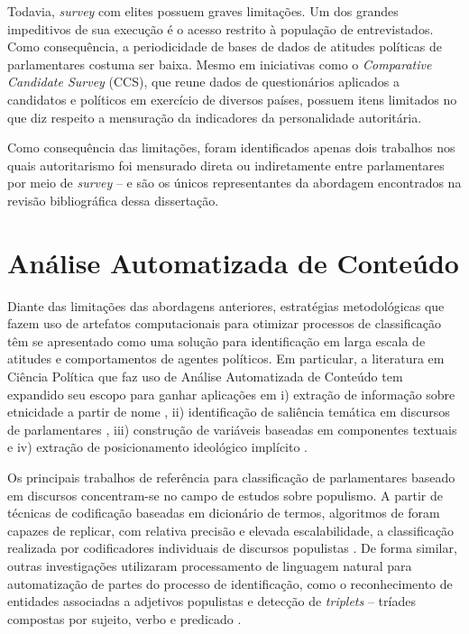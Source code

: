 \documentclass[
12pt,				%
openright,			%
twoside,			%
a4paper,			%
english,			%
french,				%
spanish,			%
brazil				%
]{abntex2}
\begin{document}
Todavia, \emph{survey} com elites possuem graves limitações. Um dos grandes impeditivos de sua execução é o acesso restrito à população de entrevistados. Como consequência, a periodicidade de bases de dados de atitudes políticas de parlamentares costuma ser baixa. Mesmo em iniciativas como o \emph{Comparative Candidate Survey} (CCS), que reune dados de questionários aplicados a candidatos e políticos em exercício de diversos países, possuem itens limitados no que diz respeito a mensuração da indicadores da personalidade autoritária. 

Como consequência das limitações, foram identificados apenas dois trabalhos nos quais autoritarismo foi mensurado direta ou indiretamente entre parlamentares por meio de \emph{survey} --  e  são os únicos representantes da abordagem encontrados na revisão bibliográfica dessa dissertação. 


\section{Análise Automatizada de Conteúdo}

Diante das limitações das abordagens anteriores, estratégias metodológicas que fazem uso de artefatos computacionais para otimizar processos de classificação têm se apresentado como uma solução para identificação em larga escala de atitudes e comportamentos de agentes políticos. Em particular, a literatura em Ciência Política que faz uso de Análise Automatizada de Conteúdo tem expandido seu escopo para ganhar aplicações em i) extração de informação sobre etnicidade a partir de nome \cite{roberts2016introduction}, ii) identificação de saliência temática em discursos de parlamentares \cite{batista2016mensurando, moreira2016palavra}, iii) construção de variáveis baseadas em componentes textuais \cite{curini2015conditional} e iv) extração de posicionamento ideológico implícito \cite{slapin2008scaling, ceron2016first}.

Os principais trabalhos de referência para classificação de parlamentares baseado em discursos concentram-se no campo de estudos sobre populismo. A partir de técnicas de codificação baseadas em dicionário de termos, algoritmos de foram capazes de replicar, com relativa precisão e elevada escalabilidade, a classificação realizada por codificadores individuais de discursos populistas \cite{pauwels2011measuring, rooduijn2011measuring, oliver2016rise}. De forma similar, outras investigações utilizaram processamento de linguagem natural para automatização de partes do processo de identificação, como o reconhecimento de entidades associadas a adjetivos populistas \cite{kyle2018populists} e detecção de \emph{triplets} -- tríades compostas por sujeito, verbo e predicado \cite{aslanidis2018measuring}.
\end{document}
